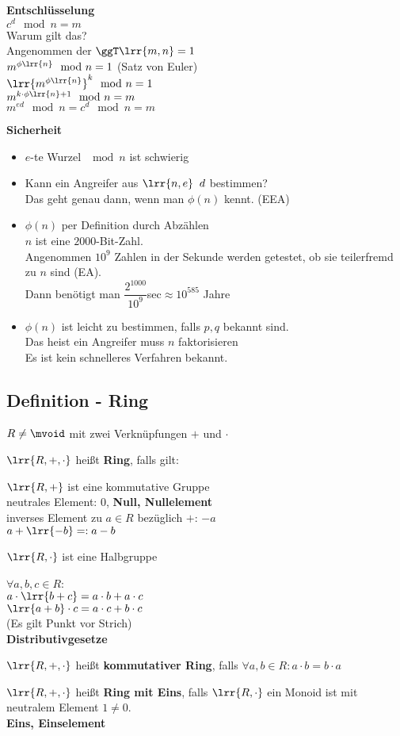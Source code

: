 	\textbf{Entschlüsselung}\\
	$c^d\mod n = m$\\
	Warum gilt das?\\
	Angenommen der $\ggT\lrr{m,n}=1$\\
	$m^{\phi\lrr{n}}\mod n=1$ (Satz von Euler)\\
	$\lrr{m^{\phi\lrr{n}}}^k\mod n = 1$\\
	$m^{k\cdot\phi\lrr{n}+1}\mod n = m$\\
	$m^{ed}\mod n = c^d\mod n=m$

	\textbf{Sicherheit}
	\begin{itemize}
		\item $e$-te Wurzel $\mod n$ ist schwierig
		\item Kann ein Angreifer aus $\lrr{n,e}\;\;d$ bestimmen?\\
			Das geht genau dann, wenn man $\phi(n)$ kennt. (EEA)
		\item $\phi(n)$ per Definition durch Abzählen\\
			$n$ ist eine $2000$-Bit-Zahl.\\
			Angenommen $10^9$ Zahlen in der Sekunde werden getestet, ob sie teilerfremd zu $n$ sind (EA).\\
			Dann benötigt man $\dfrac{2^1000}{10^9}$sec$\approx 10^{585}$ Jahre
		\item $\phi(n)$ ist leicht zu bestimmen, falls $p,q$ bekannt sind.\\
			Das heist ein Angreifer muss $n$ faktorisieren\\
			Es ist kein schnelleres Verfahren bekannt.
	\end{itemize}
\subsection{Definition - Ring}
	$R\neq\mvoid$ mit zwei Verknüpfungen $+$ und $\cdot$
		\item $\lrr{R,+,\cdot}$ heißt \textbf{Ring}, falls gilt:
				\item $\lrr{R,+}$ ist eine kommutative Gruppe\\
					neutrales Element: 0, \textbf{Null, Nullelement}\\
					inverses Element zu $a\in R$ bezüglich $+$: $-a$\\
					$a+\lrr{-b} =: a-b$
				\item $\lrr{R,\cdot}$ ist eine Halbgruppe
				\item $\forall a,b,c\in R$:\\
					$a\cdot\lrr{b+c}=a\cdot b+a\cdot c$\\
					$\lrr{a+b}\cdot c=a\cdot c+b\cdot c$\\
					(Es gilt Punkt vor Strich)\\
					\textbf{Distributivgesetze}
			\subExEnd
		\item $\lrr{R,+,\cdot}$ heißt \textbf{kommutativer Ring}, falls $\forall a,b\in R:a\cdot b=b\cdot a$
		\item $\lrr{R,+,\cdot}$ heißt \textbf{Ring mit Eins}, falls $\lrr{R,\cdot}$ ein Monoid ist mit neutralem Element $1\neq 0$.\\
			\textbf{Eins, Einselement}
	\subExEnd
